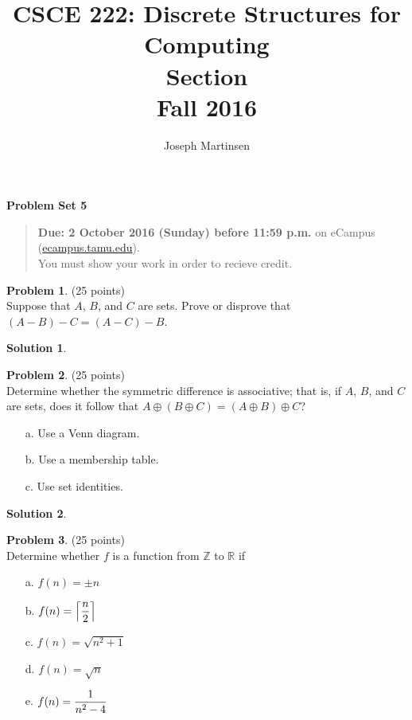 \documentclass{article}
\title{CSCE 222: Discrete Structures for Computing\\Section \mysectionnumber\\Fall 2016}
\author{Joseph Martinsen}
\theoremstyle{definition}
\newtheorem{problem}{Problem}
\newtheorem*{solution}{Solution}
\newcommand{\problemset}[1]{\begin{center}\textbf{Problem Set #1}\end{center}}
\newcommand{\duedate}[1]{\begin{quote}\textbf{Due: #1} on eCampus (\url{ecampus.tamu.edu}). \\You must show your work in order to recieve credit.\end{quote}}
\begin{document}
\maketitle

\problemset{5}

\duedate{2 October 2016 (Sunday) before 11:59 p.m.}

\bigskip

\begin{problem} (25 points)\\
Suppose that $A$, $B$, and $C$ are sets. Prove or disprove that $(A-B)-C=(A-C)-B$.
\end{problem}

\begin{solution}\ \\


\end{solution}

\newpage

\begin{problem} (25 points)\\
Determine whether the symmetric difference is associative; that is, if $A$, $B$, and $C$ are sets, does it follow that $A \oplus (B \oplus C) = (A \oplus B) \oplus C$?
\begin{enumerate}
\item[a.] Use a Venn diagram.
\item[b.] Use a membership table.
\item[c.] Use set identities.
\end{enumerate}
\end{problem}

\begin{solution}\ \\



\end{solution}

\newpage

\begin{problem} (25 points)\\
Determine whether $f$ is a function from $\mathbb{Z}$ to $\mathbb{R}$ if
\begin{enumerate}
\item[a.] $f(n) = \pm n$
\item[b.] $\displaystyle f(n) = \left\lceil{n \over 2}\right\rceil$
\item[c.] $f(n) = \sqrt{n^2+1}$
\item[d.] $f(n) = \sqrt{n}$
\item[e.] $\displaystyle f(n) = {1 \over n^2 - 4}$
\end{enumerate}
\end{problem}
\end{document}
